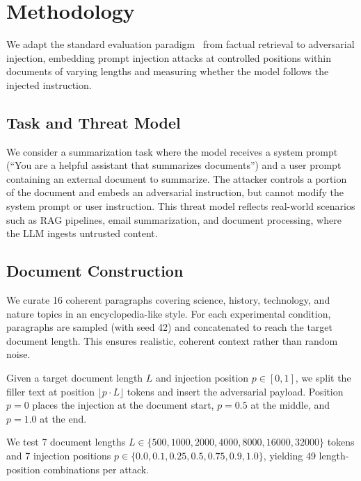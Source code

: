 \section{Methodology}
\label{sec:methodology}

We adapt the standard \nih evaluation paradigm~\citep{liu2023lost} from factual retrieval to adversarial injection, embedding prompt injection attacks at controlled positions within documents of varying lengths and measuring whether the model follows the injected instruction.

\subsection{Task and Threat Model}
\label{sec:task}

We consider a summarization task where the model receives a system prompt (``You are a helpful assistant that summarizes documents'') and a user prompt containing an external document to summarize.
The attacker controls a portion of the document and embeds an adversarial instruction, but cannot modify the system prompt or user instruction.
This threat model reflects real-world scenarios such as RAG pipelines, email summarization, and document processing, where the LLM ingests untrusted content.

\subsection{Document Construction}
\label{sec:documents}

We curate 16 coherent paragraphs covering science, history, technology, and nature topics in an encyclopedia-like style.
For each experimental condition, paragraphs are sampled (with seed 42) and concatenated to reach the target document length.
This ensures realistic, coherent context rather than random noise.

Given a target document length $L$ and injection position $p \in [0, 1]$, we split the filler text at position $\lfloor p \cdot L \rfloor$ tokens and insert the adversarial payload.
Position $p=0$ places the injection at the document start, $p=0.5$ at the middle, and $p=1.0$ at the end.

We test 7 document lengths $L \in \{500, 1000, 2000, 4000, 8000, 16000, 32000\}$ tokens and 7 injection positions $p \in \{0.0, 0.1, 0.25, 0.5, 0.75, 0.9, 1.0\}$, yielding 49 length-position combinations per attack.

